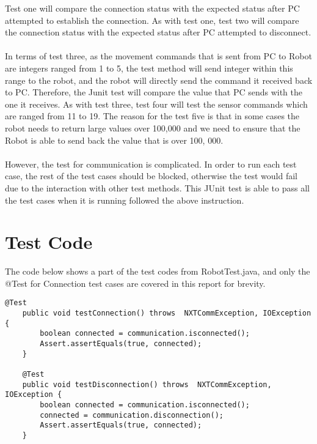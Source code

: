 \documentclass[a4paper]{article}
\begin{document}
\noindent
Test one will compare the connection status with the expected status after PC attempted to establish the connection. As with test one, test two will compare the connection status with the expected status after PC attempted to disconnect.
\\
\\
In terms of test three, as the movement commands that is sent from PC to Robot are integers ranged from 1 to 5, the test method will send integer within this range to the robot, and the robot will directly send the command it received back to PC. Therefore, the Junit test will compare the value that PC sends with the one it receives. As with test three, test four will test the sensor commands which are ranged from 11 to 19. The reason for the test five is that in some cases the robot needs to return large values over 100,000 and we need to ensure that the Robot is able to send back the value that is over 100, 000.
\\
\\
However, the test for communication is complicated. In order to run each test case, the rest of the test cases should be blocked, otherwise the test would fail due to the interaction with other test methods. This JUnit test is able to pass all the test cases when it is running followed the above instruction.

\appendix
\section{Test Code}
The code below shows a part of the test codes from RobotTest.java, and only the @Test for Connection test cases are covered in this report for brevity.
\begin{lstlisting}
@Test
	public void testConnection() throws  NXTCommException, IOException {
		boolean connected = communication.isconnected();
		Assert.assertEquals(true, connected);
	}
	
	@Test
	public void testDisconnection() throws  NXTCommException, IOException {
		boolean connected = communication.isconnected();
		connected = communication.disconnection();
		Assert.assertEquals(true, connected);
	}
	
\end{lstlisting}
\end{document}

